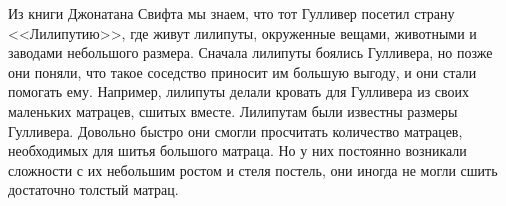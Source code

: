 Из книги Джонатана Свифта мы знаем, что тот Гулливер посетил страну <<Лилипутию>>, где живут лилипуты, окруженные вещами, животными и заводами небольшого размера. Сначала лилипуты боялись Гулливера, но позже они поняли, что такое соседство приносит им большую выгоду, и они стали помогать ему. Например, лилипуты делали кровать для Гулливера из своих маленьких матрацев, сшитых вместе. Лилипутам были известны размеры Гулливера. Довольно быстро они смогли просчитать количество матрацев, необходимых для шитья большого матраца. Но у них постоянно возникали сложности с их небольшим ростом и стеля постель, они иногда не могли сшить достаточно толстый матрац.
